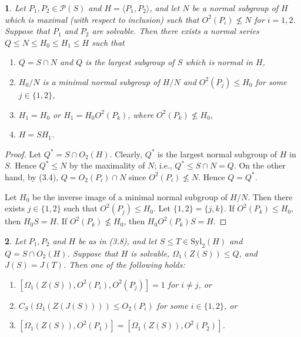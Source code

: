 \documentclass[11pt]{article}
\theoremstyle{plain}
\theoremstyle{stmplain}
\newtheorem{stm}{}[section]
\begin{document}
\begin{stm}\label{st:3.8}
Let $P_1, P_2 \in \mathcal{P}(S)$ and $H = \langle P_1, P_2 \rangle$, and let $N$
be a normal subgroup of $H$ which is maximal (with respect to inclusion) such
that $O^2(P_i) \nleq N$ for $i = 1, 2$. Suppose that $P_1$ and $P_2$ are
solvable. Then there exists a normal series $Q \le N \le H_0 \le H_1 \le H$
such that
\begin{enumerate}
\item[(a)] $Q = S \cap N$ and $Q$ is the largest subgroup of $S$ which is normal
  in $H$,
\item[(b)] $H_0/N$ is a minimal normal subgroup of $H/N$ and $O^2(P_j) \le H_0$
  for some $j \in \{1, 2\}$,
\item[(c)] $H_1 = H_0$ or $H_1 = H_0O^2(P_k)$, where $O^2(P_k) \nleq H_0$,
\item[(d)] $H = SH_1$.
\end{enumerate}
\end{stm}

\begin{proof}
Let $Q^* = S \cap O_2(H)$. Clearly, $Q^*$ is the largest normal subgroup of $H$
in $S$. Hence $Q^* \le N$ by the maximality of $N$; i.e., $Q^* \le S \cap N =
Q$. On the other hand, by (3.4), $Q = O_2(P_i) \cap N$ since $O^2(P_i) \nleq
N$. Hence $Q = Q^*$.

\smallskip
\noindent Let $H_0$ be the inverse image of a minimal normal subgroup of $H/N$. Then
there exists $j \in \{1, 2\}$ such that $O^2(P_j) \le H_0$. Let $\{1, 2\} =
\{j, k\}$. If $O^2(P_k) \le H_0$, then $H_0S = H$. If $O^2(P_k) \nleq H_0$,
then $H_0O^2(P_k)S = H$.
\end{proof}

\begin{stm}\label{st:3.9}
Let $P_1, P_2$ and $H$ be as in (3.8), and let $S \le T \in \mathrm{Syl}_2(H)$
and $Q = S \cap O_2(H)$. Suppose that $H$ is solvable, $\Omega_1(Z(S)) \le Q$,
and $J(S) = J(T)$. Then one of the following holds:
\begin{enumerate}
\item[(a)] $[\Omega_1(Z(S)), O^2(P_i), O^2(P_j)] = 1$ for $i \ne j$, or
\item[(b)] $C_S(\Omega_1(Z(J(S)))) \le O_2(P_i)$ for some $i \in \{1, 2\}$, or
\item[(c)] $[\Omega_1(Z(S)), O^2(P_1)] = [\Omega_1(Z(S)), O^2(P_2)]$.
\end{enumerate}
\end{stm}
\end{document}
